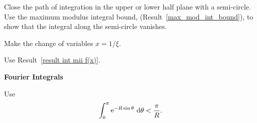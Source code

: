 {\begin{Hint}
  \label{hint integrate x2 x2+1 x2+4}
\end{Hint}





\begin{Hint}
  \label{hint int mii f(x)}
  Close the path of integration in the upper or lower half plane with a 
  semi-circle.  Use the maximum modulus integral bound, 
  (Result~\ref{max_mod_int_bound}), to show that the integral along the 
  semi-circle vanishes.
\end{Hint}




\begin{Hint}
  \label{hint 2x/(x^2+x+1)}
  Make the change of variables $x = 1/\xi$.
\end{Hint}



\begin{Hint}
  \label{hint 1/(x^4+1)}
  Use Result~\ref{result int mii f(x)}.
\end{Hint}






\begin{Hint}
  \label{hint x^6/(x^4+1)^2}
\end{Hint}







\begin{large}
  \noindent
  \textbf{Fourier Integrals}
\end{large}



\begin{Hint}
  \label{hint jordan's lemma}
  Use
  \[
  \int_0^\pi \mathop{\mathrm{e}}\nolimits^{-R \sin\theta} \,\mathrm{d} \theta < \frac{\pi}{R}.
  \]
\end{Hint}


\begin{Hint}
  \label{hint cos(2x)/(x-i pi)}
\end{Hint}








}

